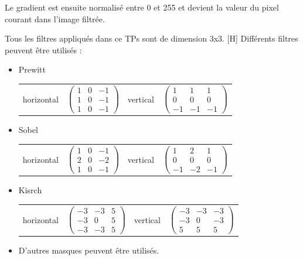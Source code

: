 \documentclass[11pt]{article}
\begin{document}
	Le gradient est ensuite normalisé entre 0 et 255 et devient la valeur du pixel courant dans l'image filtrée.

	Tous les filtres appliqués dans ce TPs sont de dimension 3x3.
[H]
	Différents filtres peuvent être utilisés :  

	\begin{itemize}
		\item Prewitt

			\begin{tabular}{cccc}
				horizontal &
				$
				\begin{pmatrix}
					1 & 0 & -1 \\
					1 & 0 & -1 \\
					1 & 0 & -1
				\end{pmatrix}
				$
				&
				vertical &
				$
				\begin{pmatrix}
				1 & 1 & 1 \\
				0 & 0 & 0 \\
				-1 & -1 & -1
				\end{pmatrix}
				$
			\end{tabular}

		\item Sobel

			\begin{tabular}{cccc}
				horizontal &
				$
				\begin{pmatrix}
				1 & 0 & -1 \\
				2 & 0 & -2 \\
				1 & 0 & -1
				\end{pmatrix}
				$
				&
				vertical &
				$
				\begin{pmatrix}
				1 & 2 & 1 \\
				0 & 0 & 0 \\
				-1 & -2 & -1
				\end{pmatrix}
				$
			\end{tabular}

		\item Kisrch

			\begin{tabular}{cccc}
				horizontal &
				$
				\begin{pmatrix}
				-3 & -3 & 5 \\
				-3 & 0 & 5 \\
				-3 & -3 & 5
				\end{pmatrix}
				$
				&
				vertical &
				$
				\begin{pmatrix}
				-3 & -3 & -3 \\
				-3 & 0 & -3 \\
				5 & 5 & 5
				\end{pmatrix}
				$
			\end{tabular}
			
			\item D'autres masques peuvent être utilisés.
	\end{itemize}
\end{document}
